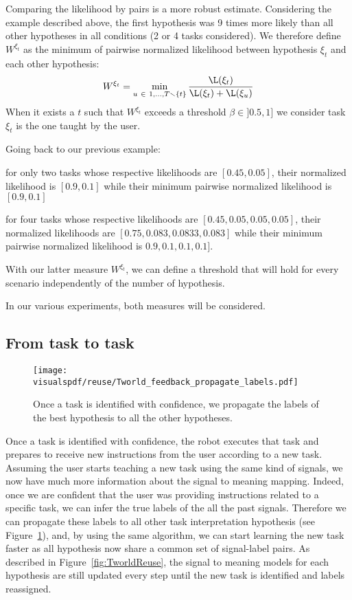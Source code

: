 Comparing the likelihood by pairs is a more robust estimate. Considering the example described above, the first hypothesis was 9 times more likely than all other hypotheses in all conditions (2 or 4 tasks considered). We therefore define $W^{\xi_t}$ as the minimum of pairwise normalized likelihood between hypothesis $\xi_t$ and each other hypothesis:
%
\begin{eqnarray}
W^{\xi_t} = \min_{u~\in~{1, \ldots, T} \smallsetminus \{t\}} \frac{\L(\xi_t)}{\L(\xi_t) + \L(\xi_u)}
\label{eq:probapairwise}
\end{eqnarray}
%
When it exists a $t$ such that $W^{\xi_t}$ exceeds a threshold $\beta \in ]0.5,1]$ we consider task $\xi_t$ is the one taught by the user.

Going back to our previous example: \begin{inparaenum}[a)] \item for only two tasks whose respective likelihoods are $[0.45, 0.05]$, their normalized likelihood is $[0.9,0.1]$ while their minimum pairwise normalized likelihood is $[0.9, 0.1]$ \item for four tasks whose respective likelihoods are $[0.45, 0.05, 0.05, 0.05]$, their normalized likelihoods are $[0.75, 0.083, 0.0833, 0.083]$ while their minimum pairwise normalized likelihood is $0.9, 0.1, 0.1, 0.1]$. \end{inparaenum} With our latter measure $W^{\xi_t}$, we can define a threshold that will hold for every scenario independently of the number of hypothesis.

In our various experiments, both measures will be considered.

\subsection{From task to task}
\label{chapter:lfui:tasttotask}

\begin{figure}[!htbp]
  \centering
  \texttt{[image: \\visualspdf/reuse/Tworld\_feedback\_propagate\_labels.pdf]}
  \caption{Once a task is identified with confidence, we propagate the labels of the best hypothesis to all the other hypotheses.}
  \label{fig:TworldPropagate}
\end{figure}

Once a task is identified with confidence, the robot executes that task and prepares to receive new instructions from the user according to a new task. Assuming the user starts teaching a new task using the same kind of signals, we now have much more information about the signal to meaning mapping. Indeed, once we are confident that the user was providing instructions related to a specific task, we can infer the true labels of the all the past signals. Therefore we can propagate these labels to all other task interpretation hypothesis (see Figure~\ref{fig:TworldPropagate}), and, by using the same algorithm, we can start learning the new task faster as all hypothesis now share a common set of signal-label pairs. As described in Figure~\ref{fig:TworldReuse}, the signal to meaning models for each hypothesis are still updated every step until the new task is identified and labels reassigned.

